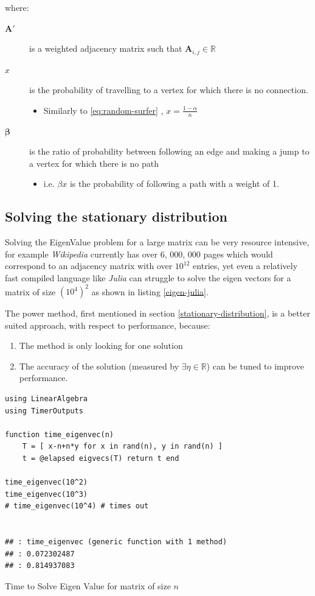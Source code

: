 \documentclass[11pt]{article}
\begin{document}
where:

\begin{description}
\item[{\(\mathbf{A'}\)}] is a weighted adjacency matrix such that \(\mathbf{A}_{i, j} \in \mathbb{R}\)
\item[{\(x\)}] is the probability of travelling to a vertex for which there is no connection.
\begin{itemize}
\item Similarly to \eqref{eq:random-surfer} , \(x = \frac{1-\alpha}{n}\)
\end{itemize}
\item[{\(\mathbf{\beta}\)}] is the ratio of probability between following an edge and
making a jump to a vertex for which there is no path
\begin{itemize}
\item i.e. \(\beta x\) is the probability of following a path with a weight of 1.
\end{itemize}
\end{description}

\subsection{Solving the stationary distribution}
\label{iterative-power-method}
Solving the EigenValue problem for a large matrix can be very resource
intensive, for example \emph{Wikipedia} currently has over 6, 000, 000 pages
\cite{WikipediaSizeWikipedia2020} which would correspond to an adjacency matrix
with over \(10^{12}\) entries, yet even a relatively fast compiled language like
\emph{Julia} can struggle to solve the eigen vectors for a matrix of size
\((10^{4})^{2}\) as shown in listing \ref{eigen-julia}.

The power method, first mentioned in section \ref{stationary-distribution}, is a
better suited approach, with respect to performance, because:

\begin{enumerate}
\item The method is only looking for one solution
\item The accuracy of the solution (measured by  \(\exists\eta\in \mathbb{R}\)) can be tuned to improve performance.
\end{enumerate}



\begin{listing}[htbp]
\begin{verbatim}
using LinearAlgebra
using TimerOutputs

function time_eigenvec(n)
    T = [ x-n+n*y for x in rand(n), y in rand(n) ]
    t = @elapsed eigvecs(T) return t end

time_eigenvec(10^2)
time_eigenvec(10^3)
# time_eigenvec(10^4) # times out


## : time_eigenvec (generic function with 1 method)
## : 0.072302487
## : 0.814937083
\end{verbatim}
\caption{\label{eigen-julia}Time to Solve Eigen Value for matrix of size \(n\)}
\end{listing}
\end{document}
